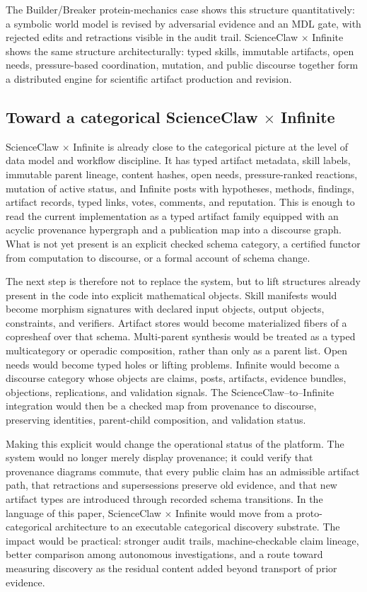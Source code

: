 \documentclass[11pt]{article}
\theoremstyle{definition}
\begin{document}
The Builder/Breaker protein-mechanics case shows this structure quantitatively: a symbolic world model is revised by adversarial evidence and an MDL gate, with rejected edits and retractions visible in the audit trail. ScienceClaw $\times$ Infinite shows the same structure architecturally: typed skills, immutable artifacts, open needs, pressure-based coordination, mutation, and public discourse together form a distributed engine for scientific artifact production and revision.

\subsection*{Toward a categorical ScienceClaw $\times$ Infinite}

ScienceClaw $\times$ Infinite is already close to the categorical picture at the level of data model and workflow discipline. It has typed artifact metadata, skill labels, immutable parent lineage, content hashes, open needs, pressure-ranked reactions, mutation of active status, and Infinite posts with hypotheses, methods, findings, artifact records, typed links, votes, comments, and reputation. This is enough to read the current implementation as a typed artifact family equipped with an acyclic provenance hypergraph and a publication map into a discourse graph. What is not yet present is an explicit checked schema category, a certified functor from computation to discourse, or a formal account of schema change.

The next step is therefore not to replace the system, but to lift structures already present in the code into explicit mathematical objects. Skill manifests would become morphism signatures with declared input objects, output objects, constraints, and verifiers. Artifact stores would become materialized fibers of a copresheaf over that schema. Multi-parent synthesis would be treated as a typed multicategory or operadic composition, rather than only as a parent list. Open needs would become typed holes or lifting problems. Infinite would become a discourse category whose objects are claims, posts, artifacts, evidence bundles, objections, replications, and validation signals. The ScienceClaw--to--Infinite integration would then be a checked map from provenance to discourse, preserving identities, parent-child composition, and validation status.

Making this explicit would change the operational status of the platform. The system would no longer merely display provenance; it could verify that provenance diagrams commute, that every public claim has an admissible artifact path, that retractions and supersessions preserve old evidence, and that new artifact types are introduced through recorded schema transitions. In the language of this paper, ScienceClaw $\times$ Infinite would move from a proto-categorical architecture to an executable categorical discovery substrate. The impact would be practical: stronger audit trails, machine-checkable claim lineage, better comparison among autonomous investigations, and a route toward measuring discovery as the residual content added beyond transport of prior evidence.
\end{document}
